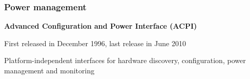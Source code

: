 \begin{frame}
\frametitle{Power management}
\bi
\item {\bf Advanced Configuration and Power Interface (ACPI) }
\item First released in December 1996, last release in June 2010
\item Platform-independent interfaces for hardware discovery, configuration, power management and monitoring
\ei
{}
\end{frame}


